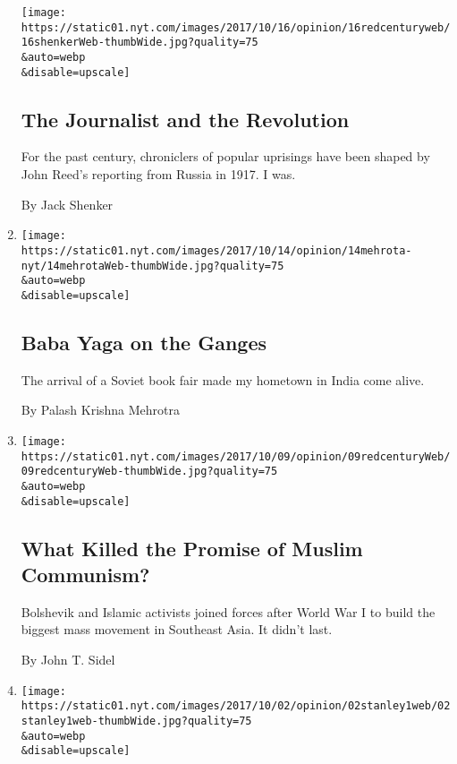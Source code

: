 \begin{enumerate}
  \texttt{[image: https://static01.nyt.com/images/2017/10/16/opinion/16redcenturyweb/16shenkerWeb-thumbWide.jpg?quality=75\\\&auto=webp\\\&disable=upscale]}

  \hypertarget{the-journalist-and-the-revolution}{%
  \subsection{The Journalist and the
  Revolution}\label{the-journalist-and-the-revolution}}

  For the past century, chroniclers of popular uprisings have been
  shaped by John Reed's reporting from Russia in 1917. I was.

  By Jack Shenker
\item
  \href{/2017/10/14/opinion/india-soviet-union-books.html}{}

  \texttt{[image: https://static01.nyt.com/images/2017/10/14/opinion/14mehrota-nyt/14mehrotaWeb-thumbWide.jpg?quality=75\\\&auto=webp\\\&disable=upscale]}

  \hypertarget{baba-yaga-on-the-ganges}{%
  \subsection{Baba Yaga on the Ganges}\label{baba-yaga-on-the-ganges}}

  The arrival of a Soviet book fair made my hometown in India come
  alive.

  By Palash Krishna Mehrotra
\item
  \href{/2017/10/09/opinion/muslim-communism.html}{}

  \texttt{[image: https://static01.nyt.com/images/2017/10/09/opinion/09redcenturyWeb/09redcenturyWeb-thumbWide.jpg?quality=75\\\&auto=webp\\\&disable=upscale]}

  \hypertarget{what-killed-the-promise-of-muslim-communism}{%
  \subsection{What Killed the Promise of Muslim
  Communism?}\label{what-killed-the-promise-of-muslim-communism}}

  Bolshevik and Islamic activists joined forces after World War I to
  build the biggest mass movement in Southeast Asia. It didn't last.

  By John T. Sidel
\item
  \href{/2017/10/02/opinion/the-communist-partys-party-people.html}{}

  \texttt{[image: https://static01.nyt.com/images/2017/10/02/opinion/02stanley1web/02stanley1web-thumbWide.jpg?quality=75\\\&auto=webp\\\&disable=upscale]}


\end{enumerate}
